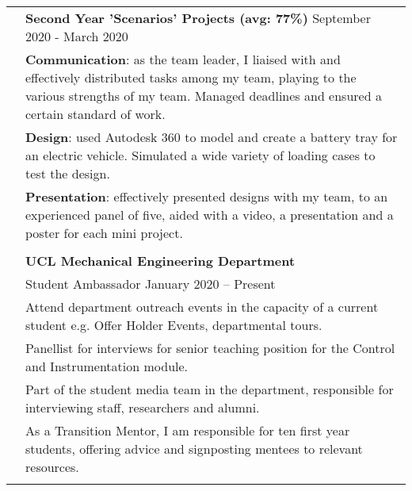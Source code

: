 \documentclass[letterpaper, 11pt]{article}
\begin{document}
\begin{longtable}{p{1.3in}p{4.8in}}

{\color{OliveGreen}{Engineering projects}} 
& \textbf{Second Year 'Scenarios' Projects (avg: 77\%)} \hfill September 2020 - March 2020 \\
& \textbf{Communication}: as the team leader, I liaised with and effectively distributed tasks among my team, playing to the various strengths of my team. Managed deadlines and ensured a certain standard of work. \\
& \textbf{Design}: used Autodesk 360 to model and create a battery tray for an electric vehicle. Simulated a wide variety of loading cases to test the design. \\
& \textbf{Presentation}: effectively presented designs with my team, to an experienced panel of five, aided with a video, a presentation and a poster for each mini project. \\
& \\


{\color{OliveGreen}{Other experience}} 
& {\textbf{UCL Mechanical Engineering Department}}\\
& Student Ambassador \hfill January 2020 -- Present \\
& Attend department outreach events in the capacity of a current student e.g. Offer Holder Events, departmental tours.\\
& Panellist for interviews for senior teaching position for the Control and Instrumentation module.\\
& Part of the student media team in the department, responsible for interviewing staff, researchers and alumni.\\
& As a Transition Mentor, I am responsible for ten first year students, offering advice and signposting mentees to relevant resources.\\
& \\


\end{longtable}
\end{document}
